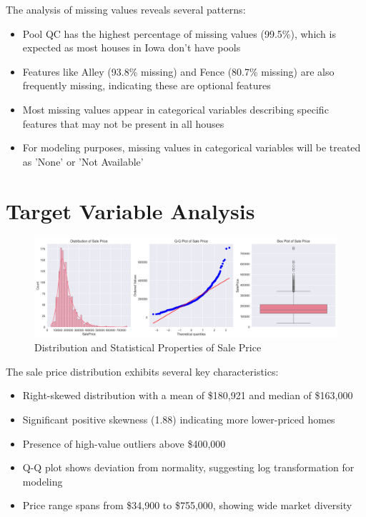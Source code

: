 The analysis of missing values reveals several patterns:
\begin{itemize}
    \item Pool QC has the highest percentage of missing values (99.5\%), which is expected as most houses in Iowa don't have pools
    \item Features like Alley (93.8\% missing) and Fence (80.7\% missing) are also frequently missing, indicating these are optional features
    \item Most missing values appear in categorical variables describing specific features that may not be present in all houses
    \item For modeling purposes, missing values in categorical variables will be treated as 'None' or 'Not Available'
\end{itemize}

\section{Target Variable Analysis}
\begin{figure}[H]
    \centering
    \includegraphics[width=1.0\textwidth]{figures/sale_price_distribution.png}
    \caption{Distribution and Statistical Properties of Sale Price}
    \label{fig:sale_price_dist}
\end{figure}

The sale price distribution exhibits several key characteristics:
\begin{itemize}
    \item Right-skewed distribution with a mean of \$180,921 and median of \$163,000
    \item Significant positive skewness (1.88) indicating more lower-priced homes
    \item Presence of high-value outliers above \$400,000
    \item Q-Q plot shows deviation from normality, suggesting log transformation for modeling
    \item Price range spans from \$34,900 to \$755,000, showing wide market diversity
\end{itemize}

